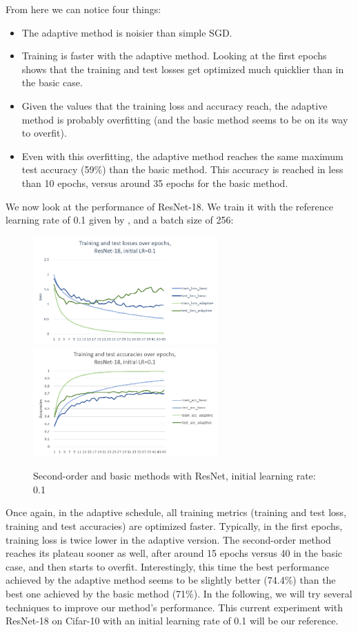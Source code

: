 \documentclass{article}
\begin{document}
  From here we can notice four things:\\
  \begin{itemize}
  	\item The adaptive method is noisier than simple SGD.
  	\item Training is faster with the adaptive method. Looking at the first epochs shows that the training and test losses get optimized much quicklier than in the basic case.
  	\item Given the values that the training loss and accuracy reach, the adaptive method is probably overfitting (and the basic method seems to be on its way to overfit).
  	\item Even with this overfitting, the adaptive method reaches the same maximum test accuracy (59\%) than the basic method. This accuracy is reached in less than 10 epochs, versus around 35 epochs for the basic method. 
  \end{itemize}

  We now look at the performance of ResNet-18. We train it with the reference learning rate of 0.1 given by \cite{he2016deep}, and a batch size of 256:
  
  \begin{figure}[!h]
	\includegraphics[width=200pt]{loss_resnet_0_1.png}
	\includegraphics[width=200pt]{acc_resnet_0_1.png}
	\caption{Second-order and basic methods with ResNet, initial learning rate: 0.1}
  \end{figure}
  
  Once again, in the adaptive schedule, all training metrics (training and test loss, training and test accuracies) are optimized faster. Typically, in the first epochs, training loss is twice lower in the adaptive version. The second-order method reaches its plateau sooner as well, after around 15 epochs versus 40 in the basic case, and then starts to overfit. Interestingly, this time the best performance achieved by the adaptive method seems to be slightly better (74.4\%) than the best one achieved by the basic method (71\%). In the following, we will try several techniques to improve our method's performance. This current experiment with ResNet-18 on Cifar-10 with an initial learning rate of 0.1 will be our reference. 
  
\end{document}
